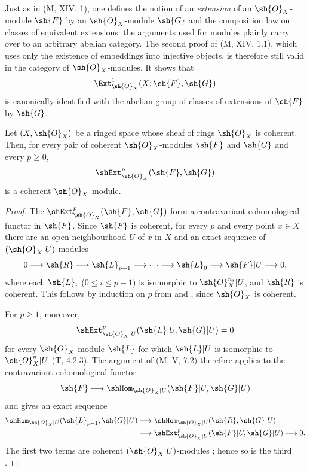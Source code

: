 \begin{env}[12.3.2]
\label{0.12.3.2}
Just as in (M, XIV, 1), one defines the notion of an
\emph{extension} of an $\sh{O}_X$-module $\sh{F}$ by an
$\sh{O}_X$-module $\sh{G}$ and the composition law on classes of
equivalent extensions: the arguments used for modules plainly carry
over to an arbitrary abelian category.
The second proof of (M, XIV, 1.1), which uses only the existence of
embeddings into injective objects, is therefore still valid in the
category of $\sh{O}_X$-modules.  It shows that
\[
  \Ext^1_{\sh{O}_X}(X;\sh{F},\sh{G})
\]
is canonically identified with the abelian group of classes of
extensions of $\sh{F}$ by $\sh{G}$.
\end{env}

\begin{proposition}[12.3.3]
\label{0.12.3.3}
Let $(X,\sh{O}_X)$ be a ringed space whose sheaf of rings
$\sh{O}_X$ is coherent.
Then, for every pair of coherent $\sh{O}_X$-modules $\sh{F}$ and
$\sh{G}$ and every $p\geq0$,
\[
  \shExt^p_{\sh{O}_X}(\sh{F},\sh{G})
\]
is a coherent $\sh{O}_X$-module.
\end{proposition}

\begin{proof}
The $\shExt^p_{\sh{O}_X}(\sh{F},\sh{G})$ form a contravariant
cohomological functor in $\sh{F}$.
Since $\sh{F}$ is coherent, for every $p$ and every point $x\in X$
there are an open neighbourhood $U$ of $x$ in $X$ and an exact
sequence of $(\sh{O}_X|U)$-modules
\[
  0\longrightarrow\sh{R}\longrightarrow\sh{L}_{p-1}
  \longrightarrow\cdots\longrightarrow\sh{L}_0
  \longrightarrow\sh{F}|U\longrightarrow0,
\]
where each $\sh{L}_i$ ($0\leq i\leq p-1$) is isomorphic to
$\sh{O}_X^{n_i}|U$, and $\sh{R}$ is coherent.
This follows by induction on $p$ from
 and
, since $\sh{O}_X$ is coherent.

For $p\geq1$, moreover,
\[
  \shExt^p_{\sh{O}_X|U}(\sh{L}|U,\sh{G}|U)=0
\]
for every $\sh{O}_X$-module $\sh{L}$ for which $\sh{L}|U$ is
isomorphic to $\sh{O}_X^n|U$ (T, 4.2.3).
The argument of (M, V, 7.2) therefore applies to the contravariant
cohomological functor
\[
  \sh{F}\longmapsto
  \shHom_{\sh{O}_X|U}(\sh{F}|U,\sh{G}|U)
\]
and gives an exact sequence
\[
  \begin{aligned}
  \shHom_{\sh{O}_X|U}(\sh{L}_{p-1},\sh{G}|U)
  &\longrightarrow
  \shHom_{\sh{O}_X|U}(\sh{R},\sh{G}|U)\\
  &\longrightarrow
  \shExt^p_{\sh{O}_X|U}(\sh{F}|U,\sh{G}|U)
  \longrightarrow0.
  \end{aligned}
\]
The first two terms are coherent $(\sh{O}_X|U)$-modules
; hence so is the third
.
\end{proof}


